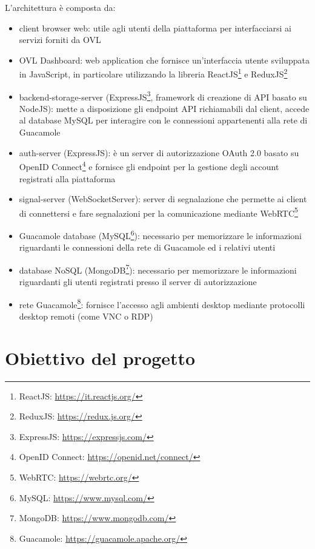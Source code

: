 L'architettura è composta da:
\begin{itemize}
    \item client browser web: utile agli utenti della piattaforma per interfacciarsi ai servizi forniti da OVL
    \item OVL Dashboard: web application che fornisce un'interfaccia utente sviluppata in JavaScript, in particolare utilizzando la libreria ReactJS\footnote{ReactJS: \url{https://it.reactjs.org/}} e ReduxJS\footnote{ReduxJS: \url{https://redux.js.org/}}
    \item backend-storage-server (ExpressJS\footnote{ExpressJS: \url{https://expressjs.com/}}, framework di creazione di API basato su NodeJS): mette a disposizione gli endpoint API richiamabili dal client, accede al database MySQL per interagire con le connessioni appartenenti alla rete di Guacamole
    \item auth-server (ExpressJS): è un server di autorizzazione OAuth 2.0 basato su OpenID Connect\footnote{OpenID Connect: \url{https://openid.net/connect/}} e fornisce gli endpoint per la gestione degli account registrati alla piattaforma
    \item signal-server (WebSocketServer): server di segnalazione che permette ai client di connettersi e fare segnalazioni per la comunicazione mediante WebRTC\footnote{WebRTC: \url{https://webrtc.org/}}
    \item Guacamole database (MySQL\footnote{MySQL: \url{https://www.mysql.com/}}): necessario per memorizzare le informazioni riguardanti le connessioni della rete di Guacamole ed i relativi utenti 
    \item database NoSQL (MongoDB\footnote{MongoDB: \url{https://www.mongodb.com/}}): necessario per memorizzare le informazioni riguardanti gli utenti registrati presso il server di autorizzazione
    \item rete Guacamole\footnote{Guacamole: \url{https://guacamole.apache.org/}}: fornisce l'accesso agli ambienti desktop mediante protocolli desktop remoti (come VNC o RDP)
\end{itemize}

\section{Obiettivo del progetto}
\label{sec:obiettivo del progetto}

